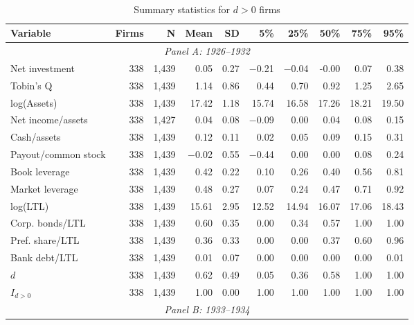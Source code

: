 \begin{table}[p]\centering
    \caption{\\ Summary statistics for $d > 0$ firms}\scriptsize
    \label{tabapp:summary_d_1}
    \begin{threeparttable}
        \begin{tabular}{lrrrrrrrrr}
            \toprule
            Variable & Firms & N & Mean & SD & 5\% & 25\% & 50\% & 75\% & 95\% \\
            \midrule
            \multicolumn{10}{c}{\textit{Panel A: 1926--1932}} \\
            \midrule
            Net investment & 338 & 1,439 & 0.05 & 0.27 & $-$0.21 & $-$0.04 & -0.00 & 0.07 & 0.38 \\
            Tobin's Q & 338 & 1,439 & 1.14 & 0.86 & 0.44 & 0.70 & 0.92 & 1.25 & 2.65 \\
            log(Assets) & 338 & 1,439 & 17.42 & 1.18 & 15.74 & 16.58 & 17.26 & 18.21 & 19.50 \\
            Net income/assets & 338 & 1,427 & 0.04 & 0.08 & $-$0.09 & 0.00 & 0.04 & 0.08 & 0.15 \\
            Cash/assets & 338 & 1,439 & 0.12 & 0.11 & 0.02 & 0.05 & 0.09 & 0.15 & 0.31 \\
            Payout/common stock & 338 & 1,439 & $-$0.02 & 0.55 & $-$0.44 & 0.00 & 0.00 & 0.08 & 0.24 \\
            Book leverage & 338 & 1,439 & 0.42 & 0.22 & 0.10 & 0.26 & 0.40 & 0.56 & 0.81 \\
            Market leverage & 338 & 1,439 & 0.48 & 0.27 & 0.07 & 0.24 & 0.47 & 0.71 & 0.92 \\
            log(LTL) & 338 & 1,439 & 15.61 & 2.95 & 12.52 & 14.94 & 16.07 & 17.06 & 18.43 \\
            Corp. bonds/LTL & 338 & 1,439 & 0.60 & 0.35 & 0.00 & 0.34 & 0.57 & 1.00 & 1.00 \\
            Pref. share/LTL & 338 & 1,439 & 0.36 & 0.33 & 0.00 & 0.00 & 0.37 & 0.60 & 0.96 \\
            Bank debt/LTL & 338 & 1,439 & 0.01 & 0.07 & 0.00 & 0.00 & 0.00 & 0.00 & 0.01 \\
            \ensuremath{d} & 338 & 1,439 & 0.62 & 0.49 & 0.05 & 0.36 & 0.58 & 1.00 & 1.00 \\
            \ensuremath{I_{d>0}} & 338 & 1,439 & 1.00 & 0.00 & 1.00 & 1.00 & 1.00 & 1.00 & 1.00 \\
            \midrule
            \multicolumn{10}{c}{\textit{Panel B: 1933--1934}} \\

\end{tabular}
\end{threeparttable}
\end{table}
